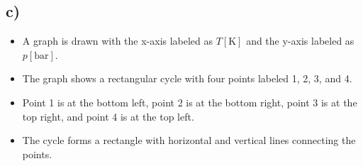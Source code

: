 

\subsection*{c)}
\begin{itemize}
    \item A graph is drawn with the x-axis labeled as $T[\text{K}]$ and the y-axis labeled as $p[\text{bar}]$.
    \item The graph shows a rectangular cycle with four points labeled 1, 2, 3, and 4.
    \item Point 1 is at the bottom left, point 2 is at the bottom right, point 3 is at the top right, and point 4 is at the top left.
    \item The cycle forms a rectangle with horizontal and vertical lines connecting the points.
\end{itemize}